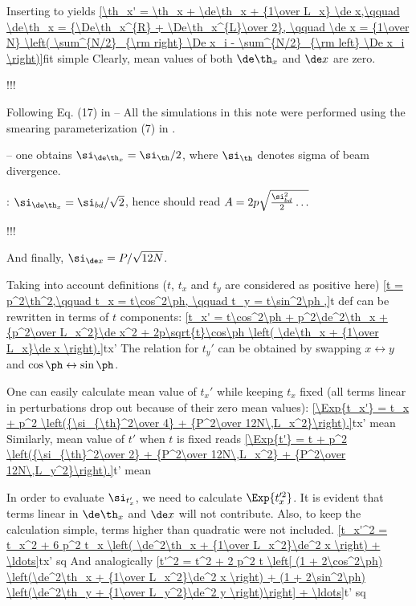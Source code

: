 Inserting  to  yields
\eqref{\th_x' = \th_x + \de\th_x + {1\over L_x} \de x,\qquad \de\th_x = {\De\th_x^{R} + \De\th_x^{L}\over 2}, \qquad \de x = {1\over N} \left( \sum^{N/2}_{\rm right} \De x_i - \sum^{N/2}_{\rm left} \De x_i \right)}{fit simple}
Clearly, mean values of both $\de\th_x$ and $\de x$ are zero. 

!!!

Following Eq. (17) in  --
All the simulations in this note were performed using the smearing parameterization (7) in . 

-- one obtains $\si_{\de\th_x} = \si_\th / 2$, where $\si_\th$ denotes sigma of beam divergence.

: $\si_{\de\th_x} = \si_{bd} / \sqrt{2}$, hence  should read $A = 2p \sqrt{{\si^2_{bd}\over 2} \ldots}$

!!!


And finally, $\si_{\de x} = P / \sqrt{12N}$.

Taking into account definitions ($t$, $t_x$ and $t_y$ are considered as positive here)
\eqref{t = p^2\th^2,\qquad t_x = t\cos^2\ph, \qquad t_y = t\sin^2\ph ,}{t def}
 can be rewritten in terms of $t$ components:
\eqref{t_x' = t\cos^2\ph + p^2\de^2\th_x + {p^2\over L_x^2}\de x^2 + 2p\sqrt{t}\cos\ph \left( \de\th_x + {1\over L_x}\de x \right).}{tx'}
The relation for $t_y'$ can be obtained by swapping $x\leftrightarrow y$ and $\cos\ph\leftrightarrow\sin\ph$. 

One can easily calculate mean value of $t_x'$ while keeping $t_x$ fixed (all terms linear in perturbations drop out because of their zero mean values):
\eqref{\Exp{t_x'} = t_x + p^2 \left({\si_{\th}^2\over 4} + {P^2\over 12N\,L_x^2}\right).}{tx' mean}
Similarly, mean value of $t'$ when $t$ is fixed reads
\eqref{\Exp{t'} = t + p^2 \left({\si_{\th}^2\over 2} + {P^2\over 12N\,L_x^2} + {P^2\over 12N\,L_y^2}\right).}{t' mean}

In order to evaluate $\si_{t_x'}$, we need to calculate $\Exp{t_x'^2}$. It is evident that terms linear in $\de\th_x$ and $\de x$ will not contribute. Also, to keep the calculation simple, terms higher than quadratic were not included. 
\eqref{t_x'^2 = t_x^2 + 6 p^2 t_x \left( \de^2\th_x + {1\over L_x^2}\de^2 x \right) + \ldots}{tx' sq}
And analogically
\eqref{t'^2 = t^2 + 2 p^2 t \left[ (1 + 2\cos^2\ph) \left(\de^2\th_x + {1\over L_x^2}\de^2 x \right) + (1 + 2\sin^2\ph) \left(\de^2\th_y + {1\over L_y^2}\de^2 y \right)\right] + \ldots}{t' sq}

